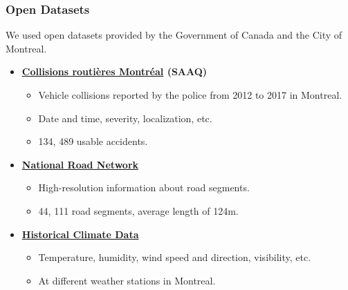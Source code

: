 \documentclass[slidestop,compress,red,mathserif]{beamer}
\begin{document}

\begin{frame}
\frametitle{Open Datasets}

\begin{footnotesize}
We used open datasets provided by the Government of Canada and the City of Montreal.

\begin{itemize}
\item[] \textbf{\href{http://donnees.ville.montreal.qc.ca/dataset/collisions-routieres}{Collisions routières Montréal} (SAAQ)}
  \begin{itemize}
  	\item Vehicle collisions reported by the police from 2012 to 2017 in Montreal.
  	\item Date and time, severity, localization, etc.
  	\item 134, 489 usable accidents.
  \end{itemize}
\item[] \textbf{\href{https://open.canada.ca/data/en/dataset/3d282116-e556-400c-9306-ca1a3cada77f}{National Road Network}}
  \begin{itemize}
    \item High-resolution information about road segments.
    \item 44, 111 road segments, average length of 124m.
  \end{itemize}
\item[] \textbf{\href{https://climate.weather.gc.ca}{Historical Climate Data}}
  \begin{itemize}
    \item Temperature, humidity, wind speed and direction, visibility, etc. 
    \item At different weather stations in Montreal.
  \end{itemize}
\end{itemize}

\end{footnotesize}

\end{frame}

\end{document}
